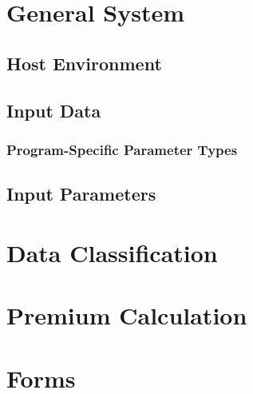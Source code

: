 


\pnumoff\part{General System}\pnumon

\chapter{Host Environment}
  

\chapter{Input Data}
    

    \section{Program-Specific Parameter Types}


\chapter{Input Parameters}
    



\pnumoff\part{Data Classification}\pnumon
  

\pnumoff\part{Premium Calculation}\pnumon
  

\pnumoff\part{Forms}\pnumon



